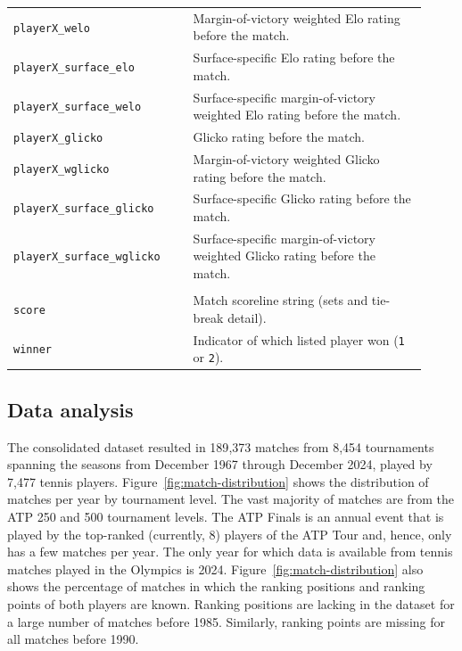 {\begin{longtable}{@{}>{\raggedright\arraybackslash}p{0.4\linewidth}p{0.52\linewidth}@{}}
  \texttt{playerX\_welo} &
    Margin-of-victory weighted Elo rating before the match. \\
  \texttt{playerX\_surface\_elo} &
    Surface-specific Elo rating before the match. \\
  \texttt{playerX\_surface\_welo} &
    Surface-specific margin-of-victory weighted Elo rating before the match. \\
  \texttt{playerX\_glicko} &
    Glicko rating before the match. \\
  \texttt{playerX\_wglicko} &
    Margin-of-victory weighted Glicko rating before the match. \\
  \texttt{playerX\_surface\_glicko} &
    Surface-specific Glicko rating before the match. \\
  \texttt{playerX\_surface\_wglicko} &
    Surface-specific margin-of-victory weighted Glicko rating before the match. \\

  \multicolumn{2}{@{}l}{\textit{Outcome}} \\
  \texttt{score} &
    Match scoreline string (sets and tie-break detail). \\
  \texttt{winner} &
    Indicator of which listed player won (\texttt{1} or \texttt{2}). \\
\end{longtable}
}

\subsection{Data analysis}

The consolidated dataset resulted in 189{,}373 matches from 8{,}454 tournaments spanning the seasons
from December 1967 through December 2024, played by 7{,}477 tennis players.
Figure~\ref{fig:match-distribution} shows the distribution of matches per year by tournament level.
The vast majority of matches are from the ATP 250 and 500 tournament levels. The ATP Finals is an
annual event that is played by the top-ranked (currently, 8) players of the ATP Tour and, hence,
only has a few matches per year. The only year for which data is available from tennis matches
played in the Olympics is 2024. Figure~\ref{fig:match-distribution} also shows the percentage of
matches in which the ranking positions and ranking points of both players are known. Ranking
positions are lacking in the dataset for a large number of matches before 1985. Similarly, ranking
points are missing for all matches before 1990.

